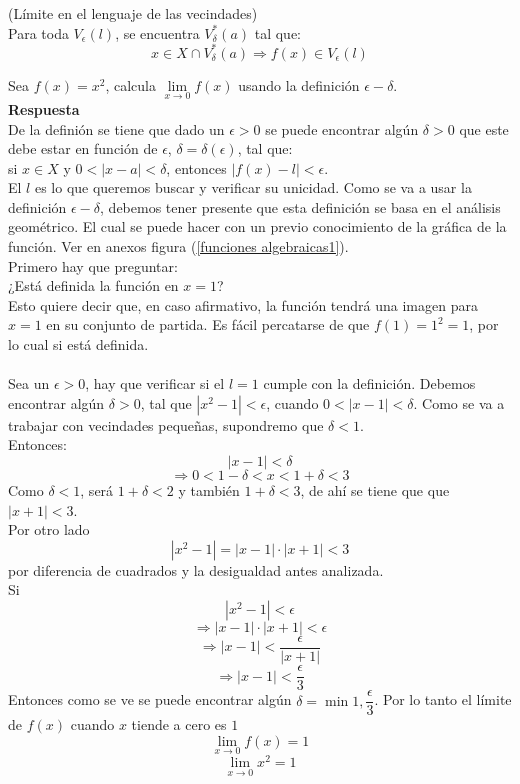 \documentclass[10pt,twoside]{SelfArx} %
\begin{document}
\begin{thm}
	(Límite en el lenguaje de las vecindades)\\
	Para toda $ V_{\epsilon}(l) $, se encuentra $ V_{\delta}^{*}(a) $ tal que:\\
	\[ x\in X\cap V_{\delta}^{*}(a)\Rightarrow f(x)\in V_{\epsilon}(l) \]
	
	
\end{thm}

\begin{ejemplo}
	Sea $ f(x)=x^{2} $, calcula $ \lim\limits_{x\rightarrow0}f(x) $ usando la definición $ \epsilon-\delta $.\\
	\textbf{Respuesta}\\
	De la definión se tiene que dado un $ \epsilon>0 $ se puede encontrar alg\'un $ \delta>0 $ que este debe estar en funci\'on de $ \epsilon $, $ \delta=\delta(\epsilon) $, tal que:\\
	si	$ x\in X $ y $ 0<|x-a|<\delta $, entonces $ |f(x)-l|<\epsilon $.\\
	El $ l $ es lo que queremos buscar y verificar su unicidad. Como se va a usar la definici\'on $ \epsilon-\delta $, debemos tener presente que esta definici\'on se basa en el análisis geométrico. El cual se puede hacer con un previo conocimiento de la gráfica de la función. Ver en anexos figura (\ref{funciones algebraicas1}).\\
	Primero hay que preguntar:\\
	¿Está definida la función en $ x=1 $?\\
	Esto quiere decir que, en caso afirmativo, la función tendrá una imagen para $ x=1 $ en su conjunto de partida. Es fácil percatarse de que $ f(1)=1^{2}=1 $, por lo cual si está definida.\\
	
	\\
	Sea un $ \epsilon>0 $, hay que verificar si el $ l=1 $ cumple con la definici\'on. Debemos encontrar alg\'un $ \delta>0 $, tal que $ |x^{2}-1|<\epsilon $, cuando $ 0<|x-1|<\delta $. Como se va a trabajar con vecindades pequeñas, supondremo que $ \delta<1 $.\\
	\newpage
	Entonces:\\
	\[ |x-1|<\delta \]
	\[ \Rightarrow0<1-\delta<x<1+\delta<3 \]
	Como $ \delta<1 $, será $ 1+\delta<2 $ y también $ 1+\delta<3 $, de ahí se tiene que que $  |x+1|<3 $.\\
	Por otro lado 
	\[ |x^{2}-1|=|x-1|\cdot|x+1|<3 \]
	por diferencia de cuadrados y la desigualdad antes analizada.\\
	Si 
	\[ |x^{2}-1|<\epsilon \]
	\[ \Rightarrow|x-1|\cdot|x+1|<\epsilon \]
	\[ \Rightarrow|x-1|<\dfrac{\epsilon}{|x+1|} \]
	\[ \Rightarrow|x-1|<\dfrac{\epsilon}{3} \]
	Entonces como se ve se puede encontrar algún $ \delta=\min{1,\dfrac{\epsilon}{3}} $.
	Por lo tanto el límite de $ f(x) $ cuando $ x $ tiende a cero es $ 1 $
	\[ \lim\limits_{x\rightarrow0}f(x)=1 \]
	\[ \lim\limits_{x\rightarrow0}x^{2}=1 \]	
\end{ejemplo}
\end{document}
